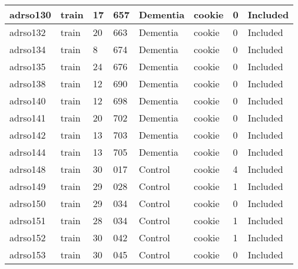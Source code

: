 \begin{center}
\begin{longtable}{|l|l|l|l|l|l|l|l|}
adrso130  & train            & 17           & 657         & Dementia             & cookie          & 0                & Included      \\ \hline
adrso132  & train            & 20           & 663         & Dementia             & cookie          & 0                & Included      \\ \hline
adrso134  & train            & 8            & 674         & Dementia             & cookie          & 0                & Included      \\ \hline
adrso135  & train            & 24           & 676         & Dementia             & cookie          & 0                & Included      \\ \hline
adrso138  & train            & 12           & 690         & Dementia             & cookie          & 0                & Included      \\ \hline
adrso140  & train            & 12           & 698         & Dementia             & cookie          & 0                & Included      \\ \hline
adrso141  & train            & 20           & 702         & Dementia             & cookie          & 0                & Included      \\ \hline
adrso142  & train            & 13           & 703         & Dementia             & cookie          & 0                & Included      \\ \hline
adrso144  & train            & 13           & 705         & Dementia             & cookie          & 0                & Included      \\ \hline
adrso148  & train            & 30           & 017         & Control              & cookie          & 4                & Included      \\ \hline
adrso149  & train            & 29           & 028         & Control              & cookie          & 1                & Included      \\ \hline
adrso150  & train            & 29           & 034         & Control              & cookie          & 0                & Included      \\ \hline
adrso151  & train            & 28           & 034         & Control              & cookie          & 1                & Included      \\ \hline
adrso152  & train            & 30           & 042         & Control              & cookie          & 1                & Included      \\ \hline
adrso153  & train            & 30           & 045         & Control              & cookie          & 0                & Included      \\ \hline

\end{longtable}
\end{center}
